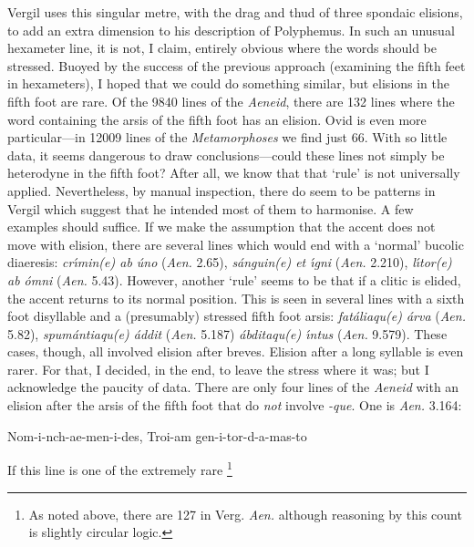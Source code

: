 \documentclass[11pt,a4paper]{scrartcl} %
\begin{document}
{Vergil uses this singular metre, with the drag and thud of three spondaic elisions, to add an extra dimension to his description of Polyphemus. In such an unusual hexameter line, it is not, I claim, entirely obvious where the words should be stressed. Buoyed by the success of the previous approach (examining the fifth feet in hexameters), I hoped that we could do something similar, but elisions in the fifth foot are rare. Of the 9840 lines of the \textit{Aeneid}, there are 132 lines where the word containing the arsis of the fifth foot has an elision. Ovid is even more particular---in 12009 lines of the \textit{Metamorphoses} we find just 66. With so little data, it seems dangerous to draw conclusions---could these lines not simply be heterodyne in the fifth foot? After all, we know that that `rule' is not universally applied. Nevertheless, by manual inspection, there do seem to be patterns in Vergil which suggest that he intended most of them to harmonise. A few examples should suffice. If we make the assumption that the accent does not move with elision, there are several lines which would end with a `normal' bucolic diaeresis: \textit{\textellipsis cr\'\i min(e) ab \'uno} (\textit{Aen.} 2.65), \textit{\textellipsis s\'anguin(e) et \'\i gni} (\textit{Aen.} 2.210), \textit{\textellipsis l\'\i tor(e) ab \'omni} (\textit{Aen.} 5.43). However, another `rule' seems to be that if a clitic is elided, the accent returns to its normal position. This is seen in several lines with a sixth foot disyllable and a (presumably) stressed fifth foot arsis: \textit{\textellipsis fat\'aliaqu(e) \'arva} (\textit{Aen.} 5.82), \textit{\textellipsis spum\'antiaqu(e) \'addit} (\textit{Aen.} 5.187) \textit{\textellipsis \'abditaqu(e) \'\i ntus} (\textit{Aen.}  9.579). These cases, though, all involved elision after breves. Elision after a long syllable is even rarer. For that, I decided, in the end, to leave the stress where it was; but I acknowledge the paucity of data. There are only four lines of the \textit{Aeneid} with an elision after the arsis of the fifth foot that do \textit{not} involve \textit{-que}. One is \textit{Aen.} 3.164:
\vspace{0.2em}
\begin{center}
        {Nom-i-nch-ae-men-i-des, Troi-am gen-i-tor-d-a-mas-to}
\end{center}
If this line is one of the extremely rare%
\footnote{As noted above, there are 127 in Verg. \textit{Aen.} although reasoning by this count is slightly circular logic.}
}
\end{document}
